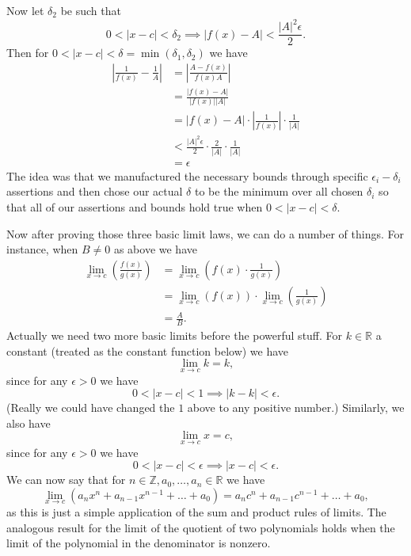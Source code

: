 \documentclass{article}[11pt]
\newcommand{\R}{\mathbb{R}}
\newcommand{\Z}{\mathbb{Z}}
\newcommand{\eps}{\epsilon}
\begin{document}
    Now let $\delta_2$ be such that
    $$ 0 < |x - c| < \delta_2 \implies |f(x) - A| < \frac{|A|^2 \eps}{2} .$$
    Then for $0 < |x - c| < \delta = \min(\delta_1, \delta_2)$ we have
    \begin{align*}
        \left| \frac{1}{f(x)} - \frac{1}{A} \right| &= \left| \frac{A - f(x)}{f(x) A} \right| \\
                                                    &= \frac{|f(x) - A|}{|f(x)| |A|} \\
                                                    &= |f(x) - A| \cdot \left| \frac{1}{f(x)} \right| \cdot \frac{1}{|A|} \\
                                                    &< \frac{|A|^2 \eps}{2} \cdot \frac{2}{|A|} \cdot \frac{1}{|A|} \\
                                                    &= \eps
    \end{align*}
    The idea was that we manufactured the necessary bounds through specific $\eps_i-\delta_i$ assertions and then chose our actual $\delta$ to be the minimum over all chosen $\delta_i$ so that all of our assertions and bounds hold true when $0 < |x - c| < \delta$.

    Now after proving those three basic limit laws, we can do a number of things. For instance, when $B \neq 0$ as above we have
    \begin{align*}
        \lim_{x \to c} \left(\frac{f(x)}{g(x)}\right) &= \lim_{x \to c} \left(f(x) \cdot \frac{1}{g(x)}\right) \\
                                         &= \lim_{x \to c} (f(x)) \cdot \lim_{x \to c} \left(\frac{1}{g(x)}\right) \\
                                         &= \frac{A}{B}.
    \end{align*}
    Actually we need two more basic limits before the powerful stuff. For $k \in \R$ a constant (treated as the constant function below) we have
    $$ \lim_{x \to c} k = k ,$$
    since for any $\eps > 0$ we have
    $$ 0 < |x - c| < 1 \implies |k - k| < \eps .$$
    (Really we could have changed the $1$ above to any positive number.) Similarly, we also have
    $$ \lim_{x \to c} x = c ,$$
    since for any $\eps > 0$ we have
    $$ 0 < |x - c| < \eps \implies |x - c| < \eps .$$
    We can now say that for $n \in \Z, a_0, \dots, a_n \in \R$ we have
    $$ \lim_{x \to c} (a_n x^n + a_{n - 1} x^{n - 1} + \dots + a_0) = a_n c^n + a_{n - 1} c^{n - 1} + \dots + a_0 ,$$
    as this is just a simple application of the sum and product rules of limits. The analogous result for the limit of the quotient of two polynomials holds when the limit of the polynomial in the denominator is nonzero.
\end{document}
